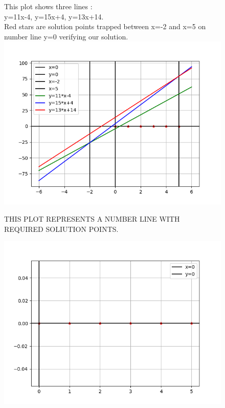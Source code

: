 \documentclass[12pt,two column]{article}
\begin{document}
\begin{figure}

This plot shows three lines :\\
y=11x-4,
y=15x+4,
y=13x+14.
\\Red stars are solution points trapped between x=-2 and x=5 on number line y=0 verifying our solution.
\includegraphics[scale=0.5]{figure_2.png}
\end{figure}

\begin{figure}
THIS PLOT REPRESENTS A NUMBER LINE WITH REQUIRED SOLIUTION POINTS.

\includegraphics[scale=1]{figure_3}
\end{figure}
\end{document}

